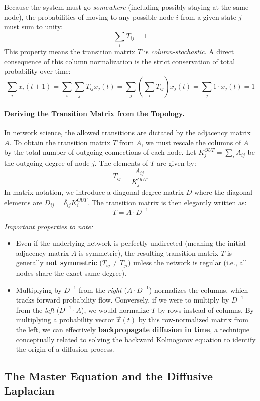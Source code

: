 Because the system must go \textit{somewhere} (including possibly staying at the same node), the probabilities of moving to any possible node $i$ from a given state $j$ must sum to unity:
\[
    \sum_{i} T_{ij} = 1
\]
This property means the transition matrix $T$ is \textit{column-stochastic}. A direct consequence of this column normalization is the strict conservation of total probability over time:
\[
    \sum_{i} x_i(t+1) = \sum_{i} \sum_{j} T_{ij} x_j(t) = \sum_{j} \left( \sum_{i} T_{ij} \right) x_j(t) = \sum_{j} 1 \cdot x_j(t) = 1
\]

\paragraph{Deriving the Transition Matrix from the Topology.}
In network science, the allowed transitions are dictated by the adjacency matrix $A$. To obtain the transition matrix $T$ from $A$, we must rescale the columns of $A$ by the total number of outgoing connections of each node. Let $K_j^{OUT} = \sum_i A_{ij}$ be the outgoing degree of node $j$. The elements of $T$ are given by:
\[
    T_{ij} = \frac{A_{ij}}{K_j^{OUT}}
\]
In matrix notation, we introduce a diagonal degree matrix $D$ where the diagonal elements are $D_{ij} = \delta_{ij} K_i^{OUT}$. The transition matrix is then elegantly written as:
\[
    T = A \cdot D^{-1}
\]

\textit{Important properties to note:}
\begin{itemize}
    \item Even if the underlying network is perfectly undirected (meaning the initial adjacency matrix $A$ is symmetric), the resulting transition matrix $T$ is generally \textbf{not symmetric} ($T_{ij} \neq T_{ji}$) unless the network is regular (i.e., all nodes share the exact same degree).
    \item Multiplying by $D^{-1}$ from the \textit{right} ($A \cdot D^{-1}$) normalizes the columns, which tracks forward probability flow. Conversely, if we were to multiply by $D^{-1}$ from the \textit{left} ($D^{-1} \cdot A$), we would normalize $T$ by rows instead of columns. By multiplying a probability vector $\vec{x}(t)$ by this row-normalized matrix from the left, we can effectively \textbf{backpropagate diffusion in time}, a technique conceptually related to solving the backward Kolmogorov equation to identify the origin of a diffusion process.
\end{itemize}

\subsection{The Master Equation and the Diffusive Laplacian}

